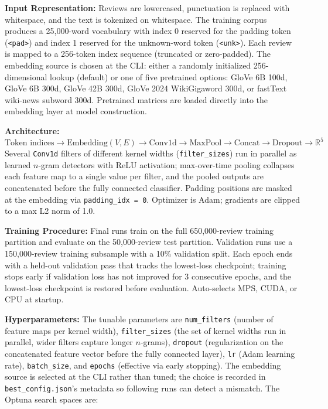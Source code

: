 \documentclass[12pt]{article}
\begin{document}
\textbf{Input Representation:} Reviews are lowercased, punctuation is replaced with whitespace, and the text is tokenized on whitespace. The training corpus produces a 25,000-word vocabulary with index 0 reserved for the padding token (\texttt{<pad>}) and index 1 reserved for the unknown-word token (\texttt{<unk>}). Each review is mapped to a 256-token index sequence (truncated or zero-padded). The embedding source is chosen at the CLI: either a randomly initialized 256-dimensional lookup (default) or one of five pretrained options: GloVe 6B 100d, GloVe 6B 300d, GloVe 42B 300d, GloVe 2024 WikiGigaword 300d, or fastText wiki-news subword 300d. Pretrained matrices are loaded directly into the embedding layer at model construction.

\textbf{Architecture:}
\[
\text{Token indices}
\to \text{Embedding}(V, E)
\to \text{Conv1d}
\to \text{MaxPool}
\to \text{Concat}
\to \text{Dropout}
\to \mathbb{R}^{5}
\]
Several \texttt{Conv1d} filters of different kernel widths (\texttt{filter\_sizes}) run in parallel as learned $n$-gram detectors with ReLU activation; max-over-time pooling collapses each feature map to a single value per filter, and the pooled outputs are concatenated before the fully connected classifier. Padding positions are masked at the embedding via \texttt{padding\_idx = 0}. Optimizer is Adam; gradients are clipped to a max L2 norm of 1.0.

\textbf{Training Procedure:} Final runs train on the full 650,000-review training partition and evaluate on the 50,000-review test partition. Validation runs use a 150,000-review training subsample with a 10\% validation split. Each epoch ends with a held-out validation pass that tracks the lowest-loss checkpoint; training stops early if validation loss has not improved for 3 consecutive epochs, and the lowest-loss checkpoint is restored before evaluation. Auto-selects MPS, CUDA, or CPU at startup.

\textbf{Hyperparameters:} The tunable parameters are \texttt{num\_filters} (number of feature maps per kernel width), \texttt{filter\_sizes} (the set of kernel widths run in parallel, wider filters capture longer $n$-grams), \texttt{dropout} (regularization on the concatenated feature vector before the fully connected layer), \texttt{lr} (Adam learning rate), \texttt{batch\_size}, and \texttt{epochs} (effective via early stopping). The embedding source is selected at the CLI rather than tuned; the choice is recorded in \texttt{best\_config.json}'s metadata so following runs can detect a mismatch. The Optuna search spaces are:
\end{document}
